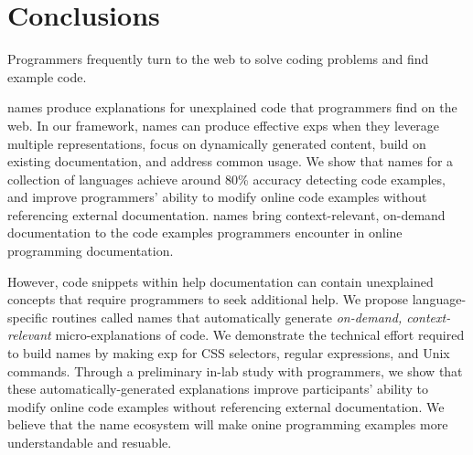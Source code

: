 \section{Conclusions}

Programmers frequently turn to the web to solve coding problems and find example code.
\begin{changes}
\Glspl{name} produce explanations for unexplained code that programmers find on the web.
In our framework, \Glspl{name} can produce effective \glspl{exp} when they leverage multiple representations, focus on dynamically generated content, build on existing documentation, and address common usage.
We show that \Glspl{name} for a collection of languages achieve around 80\% accuracy detecting code examples, and improve programmers' ability to modify online code examples without referencing external documentation.
\Glspl{name} bring context-relevant, on-demand documentation to the code examples programmers encounter in online programming documentation.
\end{changes}

However, code snippets within  help documentation can contain unexplained concepts that require programmers to seek additional help.
We propose language-specific routines called \Glspl{name} that automatically generate \emph{on-demand, context-relevant} micro-explanations of code.
We demonstrate the technical effort required to build \Glspl{name} by making \gls{exp} for CSS selectors, regular expressions, and Unix commands.
Through a preliminary in-lab study with programmers, we show that these automatically-generated explanations improve participants' ability to modify online code examples without referencing external documentation.
We believe that the \Gls{name} ecosystem will make onine programming examples more understandable and resuable.
\fi
